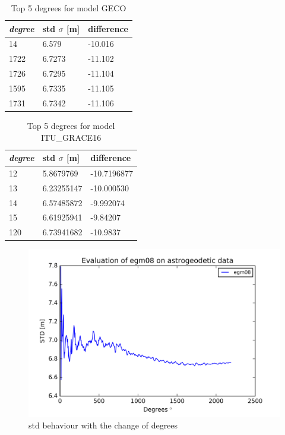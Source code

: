     
  \begin{table}[]
  	\centering
  	\caption{Top 5 degrees for model GECO}
  	\label{table:ggm_models}
  	\begin{tabular}{@{}lll@{}}
  		\toprule
  		\emph{degree} & std $\sigma$ [m]  & difference\\ \midrule
  		14 &6.579&    -10.016\\
  		1722 &6.7273&   -11.102\\
  		1726 &6.7295 &  -11.104\\
  		1595 &6.7335 &  -11.105\\
  		1731 &6.7342  & -11.106\\
  		\bottomrule
  		
  	\end{tabular}
  \end{table}
    
    
      \begin{table}[]
      	\centering
      	\caption{Top 5 degrees for model ITU\_GRACE16}
      	\label{table:ggm_models_itu_grace}
      	\begin{tabular}{@{}lll@{}}
      		\toprule
      		\emph{degree} & std $\sigma$ [m]  & difference\\ \midrule
      		12  &   5.8679769 &  -10.7196877\\
      		13  &  6.23255147 & -10.000530\\
      		14  & 6.57485872 &  -9.992074\\
      		15  & 6.61925941  & -9.84207\\
      		120 & 6.73941682 & -10.9837\\ \bottomrule
      		
      	\end{tabular}
      \end{table}
      
      
      \begin{figure}[t]
      	\caption{std behaviour with the change of degrees}
      	\label{egm2008_figure}
      	\includegraphics{Figures/egm08_figure.png}
      	\centering
      \end{figure}
      
